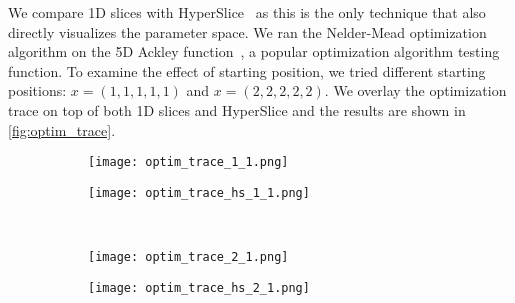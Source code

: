 We compare 1D slices with HyperSlice~\cite{Wijk:1993} as this is the only
technique that also directly visualizes the parameter space.  We ran the
Nelder-Mead optimization algorithm on the 5D Ackley
function~\cite{Ackley:1987}, a popular optimization algorithm testing function.
To examine the effect of starting position, we tried different starting
positions: \(x=(1,1,1,1,1)\) and \(x=(2,2,2,2,2)\).  We overlay the
optimization trace on top of both 1D slices and HyperSlice and the results are
shown in \autoref{fig:optim_trace}.

\begin{figure}
  \centering
  \begin{subfigure}[b]{0.35\linewidth}
    \texttt{[image: optim\_trace\_1\_1.png]}
    \subcaption{ 
      \label{fig:optim_1:sp}
    }
  \end{subfigure}
  \qquad\qquad
  \begin{subfigure}[b]{0.35\linewidth}
    \texttt{[image: optim\_trace\_hs\_1\_1.png]}
    \subcaption{
      \label{fig:optim_1:hs}
    }
  \end{subfigure}
  \\
  \begin{subfigure}[b]{0.35\linewidth}
    \texttt{[image: optim\_trace\_2\_1.png]}
    \subcaption{
      \label{fig:optim_2:sp}
    }
  \end{subfigure}
  \qquad\qquad
  \begin{subfigure}[b]{0.35\linewidth}
    \texttt{[image: optim\_trace\_hs\_2\_1.png]}

\end{subfigure}
\end{figure}
